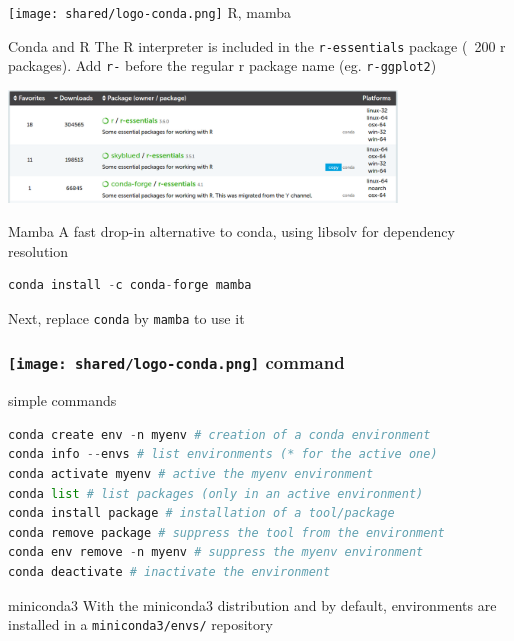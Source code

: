 \begin{frame}[containsverbatim]
{\texttt{[image: shared/logo-conda.png]} R, mamba}
\begin{block}{Conda and R}
    The R interpreter is included in the \verb|r-essentials| package (~200 r packages).
    Add \verb|r-| before the regular r package name (eg. \verb|r-ggplot2|)
    \begin{center}
        \includegraphics[height=3cm]{06_environment/Images/conda_Ressentials.png}
    \end{center}
\end{block}
\begin{block}{Mamba}
A fast drop-in alternative to conda, using libsolv for dependency resolution
\begin{lstlisting}[language=python]
conda install -c conda-forge mamba
\end{lstlisting}
Next, replace \verb|conda| by \verb|mamba| to use it
\end{block}
\end{frame}
\begin{frame}[containsverbatim]
\frametitle{\texttt{[image: shared/logo-conda.png]} command}
\begin{block}{simple commands}
\begin{lstlisting}[language=python]
conda create env -n myenv # creation of a conda environment 
conda info --envs # list environments (* for the active one) 
conda activate myenv # active the myenv environment
conda list # list packages (only in an active environment)
conda install package # installation of a tool/package
conda remove package # suppress the tool from the environment
conda env remove -n myenv # suppress the myenv environment
conda deactivate # inactivate the environment
\end{lstlisting}
\end{block}
\begin{block}{miniconda3}
With the miniconda3 distribution and by default, environments are installed in a \verb|miniconda3/envs/| repository
\end{block}
\end{frame}
